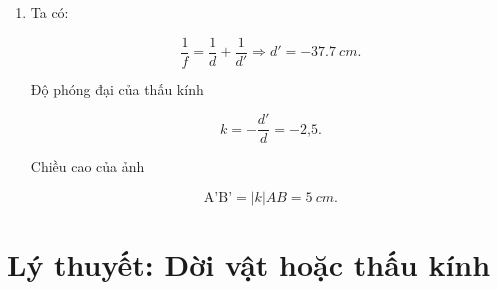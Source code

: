 \begin{enumerate}[label=\bfseries Câu \arabic*:]
{\begin{enumerate}[label=\alph*)]
			$$ D = \dfrac{1}{f} = \SI{4}{dp}.$$
			\item Ta có:
			
			$$\dfrac{1}{f} = \dfrac{1}{d} + \dfrac{1}{d'} \Rightarrow d' =-\SI{37,7}{cm}.$$
			
			Độ phóng đại của thấu kính
			
			$$ k = - \dfrac{d'}{d} = -\text{2,5}.$$
			
			Chiều cao của ảnh
			
			$$\text{A'B'} = |k|AB = \SI{5}{cm}.$$
			
			
		\end{enumerate}
	}
\end{enumerate}	
\section{Lý thuyết: Dời vật hoặc thấu kính}
